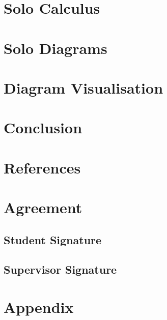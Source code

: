 \documentclass{article}
\begin{document}
    \section{Solo Calculus}
        
        
        

    \section{Solo Diagrams}
        
        
        

    \section{Diagram Visualisation}
        

    \section{Conclusion}

    \section{References}
        

    \section{Agreement}
        \subsection{Student Signature}
            \vspace{1in}

        \subsection{Supervisor Signature}
            \vspace{1in}

    \section{Appendix}
        
\end{document}
